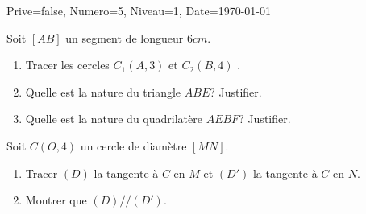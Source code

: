 \documentclass[a4paper,12pt]{article}
\begin{document}
\begin{Maquette}[DM]{Prive=false, Numero=5, Niveau=1, Date=\today}


\begin{exercice}
Soit $[AB]$ un segment de longueur $6cm$.
\begin{enumerate}
\item Tracer les cercles $C_1(A,3)$ et $C_2(B,4)$ .
\item Quelle est la nature du triangle $ABE$? Justifier.
\item Quelle est la nature du quadrilatère $AEBF$? Justifier.
\end{enumerate}
\end{exercice}

\begin{exercice}
Soit $C(O,4)$ un cercle de diamètre $[MN]$.
\begin{enumerate}
\item Tracer $(D)$ la tangente à $C$ en $M$ et $(D')$ la tangente à $C$ en $N$.
\item Montrer que $(D)//(D')$.
\end{enumerate}
\end{exercice}
\end{Maquette}
\end{document}
